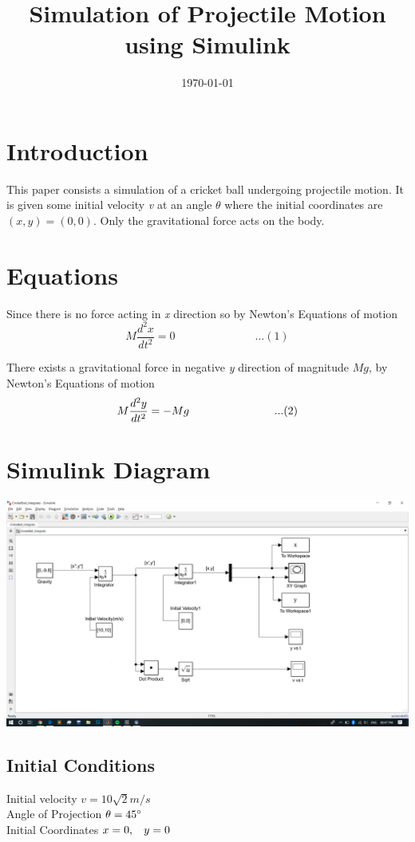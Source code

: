 \documentclass[11pt]{article}
\begin{document}
\title{Simulation of Projectile Motion using Simulink}
\date{\today}
\maketitle

\section{Introduction}
This paper consists a simulation of a cricket ball undergoing projectile motion. It is given some initial velocity \textit{v} at an angle $\theta$ where the initial coordinates  are $(\textit{x}, \textit{y})= (0,0)$. Only the gravitational force acts on the body.

\section{Equations}
  Since there is no force acting in \textit{x} direction so by Newton's Equations of motion $$M\frac{d^2x}{dt^2} = 0\hspace{3cm}...(1)$$
  
There exists a gravitational force in negative \textit{y} direction of magnitude $Mg$, by Newton's Equations of motion $$M\frac{d^2y}{dt^2} =  -Mg\hspace{2.7cm}...(2)$$

\section{Simulink Diagram}
\includegraphics[scale=0.2]{Simulink_diagram.png} 
\subsection{Initial Conditions}
Initial velocity\hspace{1 cm}
$\textit{v}= 10\sqrt{2} m/s$\\
Angle of Projection\hspace{1 cm}
$\theta = 45\degree$\\
Initial Coordinates\hspace{1cm}
$x=0,\hspace{0.3cm}y=0$
\end{document}
